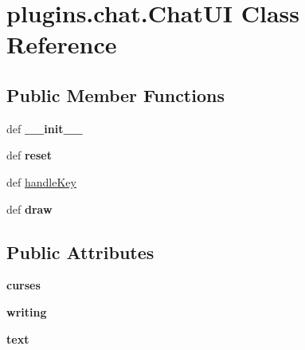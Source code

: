 \hypertarget{classplugins_1_1chat_1_1_chat_u_i}{\section{plugins.\-chat.\-Chat\-U\-I \-Class \-Reference}
\label{classplugins_1_1chat_1_1_chat_u_i}
}
\subsection*{\-Public \-Member \-Functions}
\begin{DoxyCompactItemize}
\item 
\hypertarget{classplugins_1_1chat_1_1_chat_u_i_a185f8f51e02a963b31b9b8927d973cab}{def {\bfseries \-\_\-\-\_\-init\-\_\-\-\_\-}}\label{classplugins_1_1chat_1_1_chat_u_i_a185f8f51e02a963b31b9b8927d973cab}

\item 
\hypertarget{classplugins_1_1chat_1_1_chat_u_i_a3214d4b0cb1ca2ecc14b9f20557831b5}{def {\bfseries reset}}\label{classplugins_1_1chat_1_1_chat_u_i_a3214d4b0cb1ca2ecc14b9f20557831b5}

\item 
def \hyperlink{classplugins_1_1chat_1_1_chat_u_i_a8ca26e03589001781eaf635977f8eed5}{handle\-Key}
\item 
\hypertarget{classplugins_1_1chat_1_1_chat_u_i_a6e95815ced02bbfce6bfec3964784368}{def {\bfseries draw}}\label{classplugins_1_1chat_1_1_chat_u_i_a6e95815ced02bbfce6bfec3964784368}

\end{DoxyCompactItemize}
\subsection*{\-Public \-Attributes}
\begin{DoxyCompactItemize}
\item 
\hypertarget{classplugins_1_1chat_1_1_chat_u_i_a5c7434f760dee664ed93ac7c8cfa8339}{{\bfseries curses}}\label{classplugins_1_1chat_1_1_chat_u_i_a5c7434f760dee664ed93ac7c8cfa8339}

\item 
\hypertarget{classplugins_1_1chat_1_1_chat_u_i_ae122f51127a1147db7778671275b0f63}{{\bfseries writing}}\label{classplugins_1_1chat_1_1_chat_u_i_ae122f51127a1147db7778671275b0f63}

\item 
\hypertarget{classplugins_1_1chat_1_1_chat_u_i_a96505c72247f990f688350d86f185b97}{{\bfseries text}}\label{classplugins_1_1chat_1_1_chat_u_i_a96505c72247f990f688350d86f185b97}

\end{DoxyCompactItemize}
